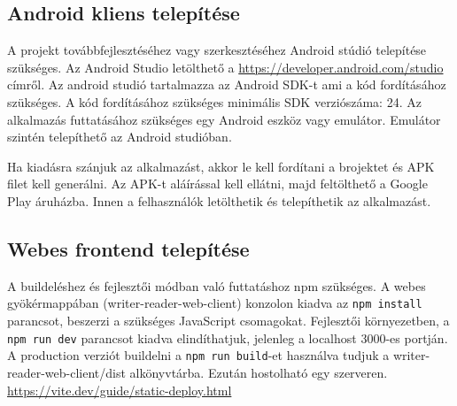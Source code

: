 \subsection{Android kliens telepítése}
A projekt továbbfejlesztéséhez vagy szerkesztéséhez Android stúdió telepítése szükséges. 
Az Android Studio letölthető a \url{https://developer.android.com/studio} címről. 
Az android studió tartalmazza az Android SDK-t ami a kód fordításához szükséges. A kód fordításához szükséges minimális SDK verziószáma: 24.
Az alkalmazás futtatásához szükséges egy Android eszköz vagy emulátor. 
Emulátor szintén telepíthető az Android studióban.

\par
Ha kiadásra szánjuk az alkalmazást, akkor le kell fordítani a brojektet és APK filet kell generálni. 
Az APK-t aláírással kell ellátni, majd feltölthető a Google Play áruházba. 
Innen a felhasználók letölthetik és telepíthetik az alkalmazást.

\subsection{Webes frontend telepítése}
A buildeléshez és fejlesztői módban való futtatáshoz npm szükséges.
A webes gyökérmappában (writer-reader-web-client) konzolon kiadva az \texttt{npm install} parancsot, beszerzi a szükséges JavaScript csomagokat.
Fejlesztői környezetben, a \texttt{npm run dev} parancsot kiadva elindíthatjuk, jelenleg a localhost 3000-es portján.
A production verziót buildelni a \texttt{npm run build}-et használva tudjuk a writer-reader-web-client/dist alkönyvtárba.
Ezután hostolható egy szerveren. \url{https://vite.dev/guide/static-deploy.html}
